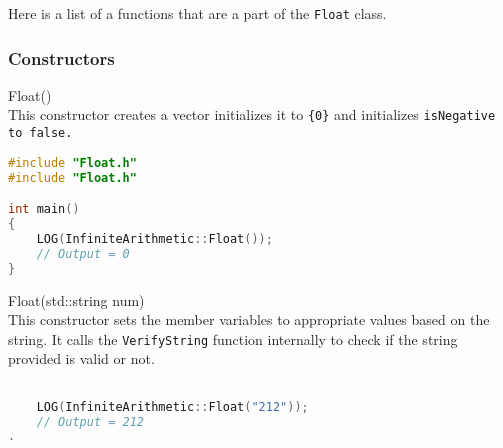 
Here is a list of a functions that are a part of the \verb|Float| class. 

\subsubsection{Constructors} \vspace*{1em}

{\ttfamily \large Float()} \\[2mm]
This constructor creates a vector initializes it to \verb|{0}| and initializes \tt{isNegative} to \tt{false}.
\vspace*{1em}
\begin{lstlisting}[language = C]
#include "Float.h"
#include "Float.h"

int main()
{
	LOG(InfiniteArithmetic::Float());
	// Output = 0
}
\end{lstlisting}
\vspace*{1em}


\noindent
{\ttfamily \large Float(std::string num)} \\[2mm]
This constructor sets the member variables to appropriate values based on the string. It calls the \verb|VerifyString| function internally to check if the string provided is valid or not.
\vspace*{1em}
\begin{lstlisting}[language = C]

	LOG(InfiniteArithmetic::Float("212"));
	// Output = 212
.
\end{lstlisting}
\vspace*{1em}



